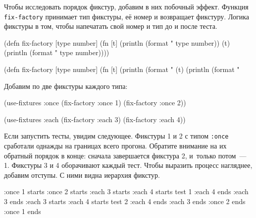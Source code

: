 Чтобы исследовать порядок фикстур, добавим в них побочный эффект. Функция
\verb|fix-factory| принимает тип фикстуры, её номер и возвращает
фикстуру. Логика фикстуры в том, чтобы напечатать свой номер и тип до и после
теста.


\ifx\DEVICETYPE\MOBILE

\begin{english}
  \begin{clojure}
(defn fix-factory [type number]
  (fn [t]
    (println (format "%
               type number))
    (t)
    (println (format "%
               type number))))
  \end{clojure}
\end{english}

\else

\begin{english}
  \begin{clojure}
(defn fix-factory [type number]
  (fn [t]
    (println (format "%
    (t)
    (println (format "%
  \end{clojure}
\end{english}

\fi

\noindent
Добавим по две фикстуры каждого типа:

\begin{english}
  \begin{clojure}
(use-fixtures :once
  (fix-factory :once 1)
  (fix-factory :once 2))

(use-fixtures :each
  (fix-factory :each 3)
  (fix-factory :each 4))
  \end{clojure}
\end{english}

Если запустить тесты, увидим следующее. Фикстуры 1 и 2 с типом \verb|:once|
сработали однажды на границах всего прогона. Обратите внимание на их обратный
порядок в конце: сначала завершается фикстура 2, и~только потом~--- 1. Фикстуры
3 и 4 оборачивают каждый тест. Чтобы выразить процесс нагляднее, добавим
отступы. С ними видна иерархия фикстур.


\begin{english}
  \begin{clojure}
:once 1 starts
  :once 2 starts
    :each 3 starts
      :each 4 starts
        test 1
      :each 4 ends
    :each 3 ends
    :each 3 starts
      :each 4 starts
        test 2
      :each 4 ends
    :each 3 ends
  :once 2 ends
:once 1 ends
  \end{clojure}
\end{english}

